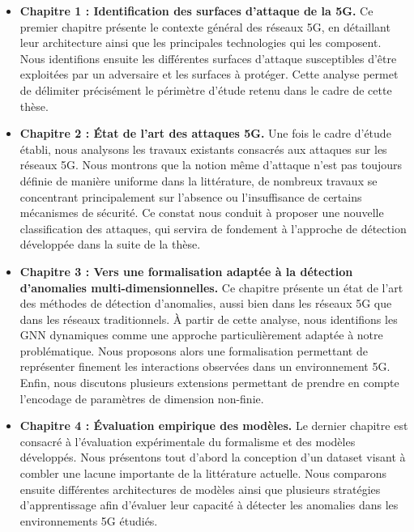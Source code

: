 \documentclass[a4paper,11pt,twoside]{StyleThese}
\begin{document}
\begin{itemize}
\item \textbf{Chapitre 1 : Identification des surfaces d'attaque de la 5G.}
Ce premier chapitre présente le contexte général des réseaux 5G, en détaillant leur architecture ainsi que les principales technologies qui les composent. Nous identifions ensuite les différentes surfaces d'attaque susceptibles d'être exploitées par un adversaire et les surfaces à protéger. Cette analyse permet de délimiter précisément le périmètre d'étude retenu dans le cadre de cette thèse.

\item \textbf{Chapitre 2 : État de l'art des attaques 5G.}
Une fois le cadre d'étude établi, nous analysons les travaux existants consacrés aux attaques sur les réseaux 5G. Nous montrons que la notion même d'attaque n'est pas toujours définie de manière uniforme dans la littérature, de nombreux travaux se concentrant principalement sur l'absence ou l'insuffisance de certains mécanismes de sécurité. Ce constat nous conduit à proposer une nouvelle classification des attaques, qui servira de fondement à l'approche de détection développée dans la suite de la thèse.

\item \textbf{Chapitre 3 : Vers une formalisation adaptée à la détection d'anomalies multi-dimensionnelles.}
Ce chapitre présente un état de l'art des méthodes de détection d'anomalies, aussi bien dans les réseaux 5G que dans les réseaux traditionnels. À partir de cette analyse, nous identifions les GNN dynamiques comme une approche particulièrement adaptée à notre problématique. Nous proposons alors une formalisation permettant de représenter finement les interactions observées dans un environnement 5G. Enfin, nous discutons plusieurs extensions permettant de prendre en compte l'encodage de paramètres de dimension non-finie.

\item \textbf{Chapitre 4 : Évaluation empirique des modèles.}
Le dernier chapitre est consacré à l'évaluation expérimentale du formalisme et des modèles développés. Nous présentons tout d'abord la conception d'un dataset visant à combler une lacune importante de la littérature actuelle. Nous comparons ensuite différentes architectures de modèles ainsi que plusieurs stratégies d'apprentissage afin d'évaluer leur capacité à détecter les anomalies dans les environnements 5G étudiés.

\end{itemize}

\ifdefined{}
\else


\end{document}
